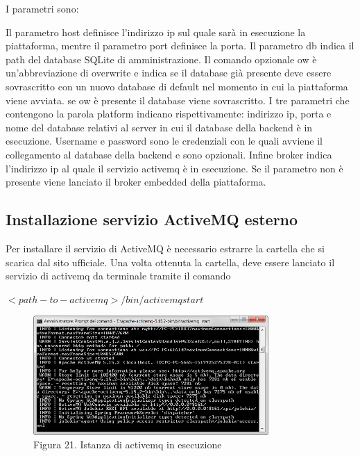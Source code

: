 I parametri sono:
{\selectfont
	
}
Il parametro host definisce l'indirizzo ip sul quale sarà in esecuzione la piattaforma, mentre il parametro port definisce la porta.
Il parametro db indica il path del database SQLite di amministrazione. Il comando opzionale ow è un'abbreviazione di overwrite e indica se il database già presente deve essere sovrascritto con un nuovo database di default nel momento in cui la piattaforma viene avviata. se ow è presente il database viene sovrascritto.
I tre parametri che contengono la parola platform indicano rispettivamente: indirizzo ip, porta e nome del database relativi al server in cui il database della backend è in esecuzione.
Username e password sono le credenziali con le quali avviene il collegamento al database della backend e sono opzionali. Infine broker indica l'indirizzo ip al quale il servizio activemq è in esecuzione. Se il parametro non è presente viene lanciato il broker embedded della piattaforma.
\clearpage
\subsection{Installazione servizio ActiveMQ esterno}
Per installare il servizio di ActiveMQ è necessario estrarre la cartella che si scarica dal sito ufficiale. Una volta ottenuta la cartella, deve essere lanciato il servizio di activemq da terminale tramite il comando 

$<path-to-activemq>/bin/activemq start$
\begin{figure}[h]
	\centering
	\includegraphics[width=0.8\textwidth]{activemq-in-esecuzione.png}
	\caption*{Figura 21. Istanza di activemq in esecuzione}
\end{figure}
\clearpage
